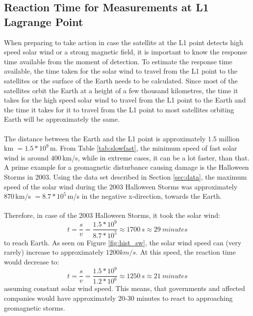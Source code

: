 \documentclass[12pt]{article}
\begin{document}
    \subsection{Reaction Time for Measurements at L1 Lagrange Point}
        When preparing to take action in case the satellite at the L1 point detects high speed solar wind or a strong magnetic field, it is important to know the response time available from the moment of detection. To estimate the response time available, the time taken for the solar wind to travel from the L1 point to the satellites or the surface of the Earth needs to be calculated. Since most of the satellites orbit the Earth at a height of a few thousand kilometres, the time it takes for the high speed solar wind to travel from the L1 point to the Earth and the time it takes for it to travel from the L1 point to most satellites orbiting Earth will be approximately the same.\\ \\
        The distance between the Earth and the L1 point is approximately $1.5$ million km $ = 1.5*10^9\,$m. From Table \ref{tab:slowfast}, the minimum speed of fast solar wind is around $400\,$km/s, while in extreme cases, it can be a lot faster, than that. A prime example for a geomagnetic disturbance causing damage is the Halloween Storms in 2003. Using the data set described in Section \ref{sec:data}, the maximum speed of the solar wind during the 2003 Halloween Storms was approximately $870\,$km/s $ = 8.7*10^5\,$m/s in the negative x-direction, towards the Earth.\\ \\
        Therefore, in case of the 2003 Halloween Storms, it took the solar wind:
        \begin{equation}
            t=\frac{s}{v}=\frac{1.5*10^9}{8.7*10^5}\approx 1700\,s\approx 29\ minutes
        \end{equation}
        to reach Earth. As seen on Figure \ref{fig:hist_sw}, the solar wind speed can (very rarely) increase to approximately $1200km/s$. At this speed, the reaction time would decrease to:
        \begin{equation}
            t=\frac{s}{v}=\frac{1.5*10^9}{1.2*10^6}\approx 1250\,s\approx 21\ minutes
        \end{equation}
        assuming constant solar wind speed. This means, that governments and affected companies would have approximately 20-30 minutes to react to approaching geomagnetic storms.
\end{document}
